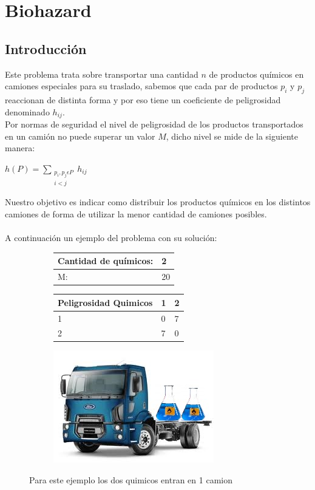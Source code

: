\section{Biohazard}

\subsection{Introducci\'on}
Este problema trata sobre transportar una cantidad  $n$ de productos químicos en camiones especiales para su traslado, sabemos que cada par de productos $p_{i}$ y $p_{j}$ reaccionan de distinta forma y por eso tiene un coeficiente de peligrosidad denominado $h_{ij}$. \\
Por normas de seguridad el nivel de peligrosidad de los productos transportados en un camión no puede superar un valor $M$, dicho nivel se mide de la siguiente manera:

$h(P) = \sum\limits_{\substack{
p_{i},p_{j} \epsilon P \\
i<j}} h_{ij}$ 


Nuestro objetivo es indicar como distribuir los productos químicos en los distintos camiones de forma de utilizar la menor cantidad de camiones posibles. \\ \\

A continuación un ejemplo del problema con su solución:


\begin{figure}[H]
  \centering
	\begin{subfigure}[b]{0.3\textwidth}
	
\begin{tabular}{| l | l |}
\hline
Cantidad de químicos:   & 2 \\ \hline
M:  & 20 \\ \hline
\end{tabular}


\begin{tabular}{| l | l | l |}
    \hline
    Peligrosidad Quimicos & 1 & 2 \\ \hline
    1 & 0 & 7 \\ \hline
    2 & 7 & 0 \\ \hline
\end{tabular}

	\end{subfigure} 
	\begin{subfigure}[b]{0.8\textwidth}

	 \includegraphics[scale=0.9]{Imagenes/Ej3/intro}
      
     \end{subfigure}
     \caption{Para este ejemplo los dos quimicos entran en 1 camion}
\end{figure}

